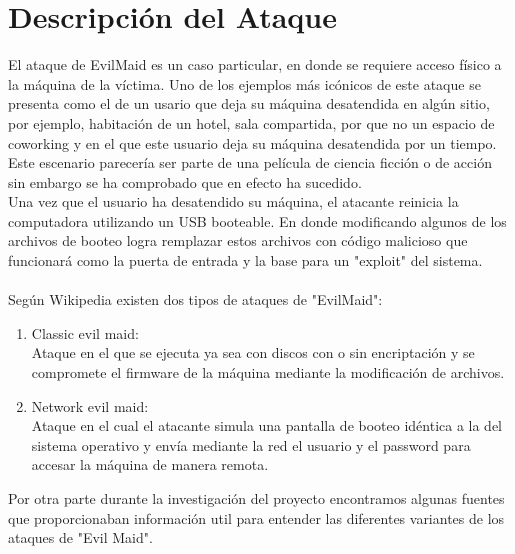 \documentclass{article}
\begin{document}
\section*{Descripción del Ataque}

\tab El ataque de EvilMaid es un caso particular, en donde se requiere acceso físico a la máquina de la víctima. Uno de los ejemplos más icónicos de este ataque se presenta como el de un usario que deja su máquina desatendida en algún sitio, por ejemplo, habitación de un hotel, sala compartida, por que no un espacio de coworking y en el que este usuario deja su máquina desatendida por un tiempo. Este escenario parecería ser parte de una película de ciencia ficción o de acción sin embargo se ha comprobado que en efecto ha sucedido. \\

Una vez que el usuario ha desatendido su máquina, el atacante reinicia la computadora utilizando un USB booteable. En donde modificando algunos de los archivos de booteo logra remplazar estos archivos con código malicioso que funcionará como la puerta de entrada y la base para un "exploit" del sistema.
\\
\\
Según Wikipedia existen dos tipos de ataques de "EvilMaid":

\begin{enumerate}

  \item Classic evil maid: \\
  Ataque en el que se ejecuta ya sea con discos con o sin encriptación y se compromete el firmware de la máquina mediante la modificación de archivos.
  
  \item Network evil maid: \\
  Ataque en el cual el atacante simula una pantalla de booteo idéntica a la del sistema operativo y envía mediante la red el usuario y el password para accesar la máquina de manera remota.

\end{enumerate}

Por otra parte durante la investigación del proyecto encontramos algunas fuentes que proporcionaban información util para entender las diferentes variantes de los ataques de "Evil Maid". 
\end{document}
